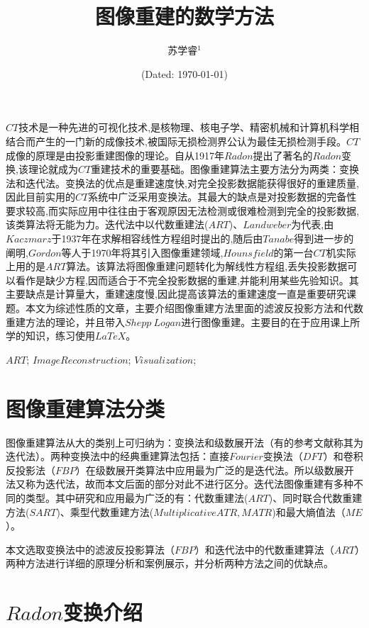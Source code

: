 \documentclass[hyperref]{ctexart}
\title{\textbf{图像重建的数学方法}}
\author{\sffamily 苏学睿$^1$}
\date{(Dated: \today)}
\begin{document}
	\maketitle

			$CT$技术是一种先进的可视化技术,是核物理、核电子学、精密机械和计算机科学相结合而产生的一门新的成像技术,被国际无损检测界公认为最佳无损检测手段。$CT$成像的原理是由投影重建图像的理论。自从1917年$Radon$提出了著名的$Radon$变换,该理论就成为$CT$重建技术的重要基础。图像重建算法主要方法分为两类：变换法和迭代法。变换法的优点是重建速度快,对完全投影数据能获得很好的重建质量,因此目前实用的$CT$系统中广泛采用变换法。其最大的缺点是对投影数据的完备性要求较高,而实际应用中往往由于客观原因无法检测或很难检测到完全的投影数据,该类算法将无能为力。迭代法中以代数重建法($ART$)、$Landweber$为代表,由$Kaczmarz$于1937年在求解相容线性方程组时提出的,随后由$Tanabe$得到进一步的阐明,$Gordon$等人于1970年将其引入图像重建领域,$Hounsfield$的第一台$CT$机实际上用的是$ART$算法。该算法将图像重建问题转化为解线性方程组,丢失投影数据可以看作是缺少方程,因而适合于不完全投影数据的重建,并能利用某些先验知识。其主要缺点是计算量大，重建速度慢,因此提高该算法的重建速度一直是重要研究课题。本文为综述性质的文章，主要介绍图像重建方法里面的滤波反投影方法和代数重建方法的理论，并且带入$Shepp\ Logan$进行图像重建。主要目的在于应用课上所学的知识，练习使用$LaTeX$。
		
		$ART$; $Image Reconstruction$; $Visualization$;
	\newpage
	\section{图像重建算法分类}
	图像重建算法从大的类别上可归纳为：变换法和级数展开法（有的参考文献称其为迭代法）。两种变换法中的经典重建算法包括：直接$Fourier$变换法（$DFT$）和卷积反投影法（$FBP$）在级数展开类算法中应用最为广泛的是迭代法。所以级数展开法又称为迭代法，故而本文后面的部分对此不进行区分。迭代法图像重建有多种不同的类型。其中研究和应用最为广泛的有：代数重建法($ART$)、同时联合代数重建方法($SART$)、乘型代数重建方法($Multiplicative ATR ,MATR$)和最大熵值法（$ME$）。

	本文选取变换法中的滤波反投影算法（$FBP$）和迭代法中的代数重建算法（$ART$）两种方法进行详细的原理分析和案例展示，并分析两种方法之间的优缺点。
	
	\section{$Radon$变换介绍}
\end{document}
